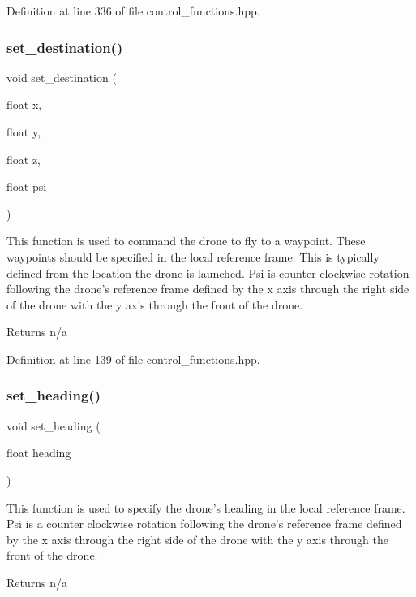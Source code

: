 Definition at line 336 of file control\+\_\+functions.\+hpp.

\mbox{\label{group__control__functions_gab90a45d8b081ba329b9d0f886adbc2d5}} 
\subsubsection{\texorpdfstring{set\_destination()}{set\_destination()}}
{\footnotesize\ttfamily void set\+\_\+destination (\begin{DoxyParamCaption}\item[{float}]{x,  }\item[{float}]{y,  }\item[{float}]{z,  }\item[{float}]{psi }\end{DoxyParamCaption})}

This function is used to command the drone to fly to a waypoint. These waypoints should be specified in the local reference frame. This is typically defined from the location the drone is launched. Psi is counter clockwise rotation following the drone’s reference frame defined by the x axis through the right side of the drone with the y axis through the front of the drone. \begin{DoxyReturn}{Returns}
n/a 
\end{DoxyReturn}


Definition at line 139 of file control\+\_\+functions.\+hpp.

\mbox{\label{group__control__functions_ga92292bc0da7dd2a58edf8e9aa10eb682}} 
\subsubsection{\texorpdfstring{set\_heading()}{set\_heading()}}
{\footnotesize\ttfamily void set\+\_\+heading (\begin{DoxyParamCaption}\item[{float}]{heading }\end{DoxyParamCaption})}

This function is used to specify the drone’s heading in the local reference frame. Psi is a counter clockwise rotation following the drone’s reference frame defined by the x axis through the right side of the drone with the y axis through the front of the drone. \begin{DoxyReturn}{Returns}
n/a 
\end{DoxyReturn}



